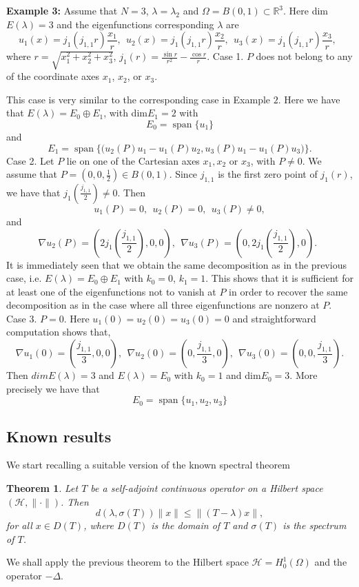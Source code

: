 \documentclass[11pt,reqno]{article}
\newtheorem{teo}{Theorem}[section]
\numberwithin{equation}{section}
\newcommand\R{\mathbb R}
\newcommand\la\lambda
\renewcommand\O\Omega
\begin{document}
\vskip0.2cm
{\bf Example 3: }
Assume that $N=3$, $\lambda=\lambda_2$ and $\O=B(0,1)\subset\R^3$. Here dim$E(\la)=3$ and the eigenfunctions corresponding  $\lambda$  are 
\begin{equation}
    u_1(x)=j_1(j_{1,1} r)\frac{x_1}{r},\ \  u_2(x)=j_1(j_{1,1} r)\frac{x_2}{r},\ \  u_3(x)=j_1(j_{1,1} r)\frac{x_3}{r},\ \ 
\end{equation}
where $r=\sqrt{x_1^2+x_2^2+x_3^2}$, $j_1(r)=\frac{\sin r}{r^2}-\frac{\cos r}{r}$.
\vskip0.1cm
Case 1. $P$ does not belong to any of the coordinate axes $x_1$, $x_2$, or $x_3$.

This case is very similar to the corresponding case in Example $2$. Here we have that $E(\la)=E_0\oplus E_1$, with dim$E_1=2$ with
$$E_0=\operatorname{span}\{u_1\}$$
and
$$E_1= \operatorname{span}\{\big(u_2(P)u_1-u_1(P)u_2,u_3(P)u_1-u_1(P)u_3\big)\}.$$
\vskip0.2cm
Case 2. Let $P$ lie on one of the Cartesian axes $x_1, x_2$ or $x_3$, with $P \neq 0$. We assume that $P=(0,0,\frac{1}{2})\in B(0,1)$. Since $j_{1,1}$ is the first zero point of $j_1(r)$, we have that $j_1(\frac{j_{1,1}}{2})\neq 0$.
Then 
\begin{equation}
    u_1(P)=0,\ \ u_2(P)=0,\ \ u_3(P)\neq 0,
\end{equation}
and 
\begin{equation}
    \nabla u_2(P)=(2j_1(\frac{j_{1,1}}{2}),0,0) ,\ \ \nabla u_3(P)=(0,2j_1(\frac{j_{1,1}}{2}),0).\ \ 
\end{equation}
It is immediately seen that we obtain the same decomposition as in the previous case, i.e. $E(\lambda)=E_0\oplus E_1$ with $k_0=0$, $k_1=1$. This shows that it is sufficient for at least one of the eigenfunctions not to vanish at $P$ in order to recover the same decomposition as in the case where all three eigenfunctions are nonzero at $P$.
\vskip0.2cm
Case 3. $P=0$. Here $u_1(0)=u_2(0)=u_3(0)=0$ and straightforward computation shows that, 
\begin{equation}
    \nabla u_1(0)=(\frac{j_{1,1}}{3},0,0),\ \    \nabla u_2(0)=(0,\frac{j_{1,1}}{3},0),\ \ \nabla u_3(0)=(0,0,\frac{j_{1,1}}{3}).
\end{equation}
Then $dim E(\lambda)=3$ and $E(\lambda)=E_0$ with $k_0=1$ and dim$E_0=3$. More precisely we have that
$$E_0= \operatorname{span}\{u_1,u_2,u_3\}
$$

 \subsection{Known results}
We start recalling a suitable version of the known spectral theorem
\begin{teo}\label{th_spectral}\cite[Proposition 8.20]{helffer2013} Let $T$ be a self-adjoint continuous operator on a Hilbert space $(\mathcal{H},\|\cdot\|)$. Then $$d(\la,\sigma(T))\|x\|\leq \|(T-\la)x\|,$$ for all $x\in D(T)$, where $D(T)$ is the domain of $T$ and $\sigma(T)$ is the spectrum of $T$.  
\end{teo}
We shall apply the previous theorem to the Hilbert space $\mathcal{H}=H_0^1(\O)$ and the operator $-\Delta$.
\end{document}
